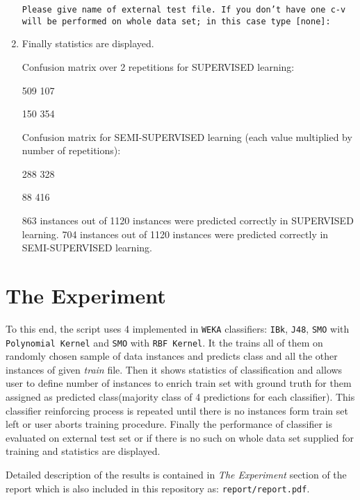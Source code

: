 \begin{enumerate}
\texttt{Please give name of external test file. If you don't have one c-v will be performed on whole data set; in this case  type [none]:}

\item Finally statistics are displayed.

\begin{spverbatim}
Confusion matrix over 2 repetitions for SUPERVISED learning:

    509 107

    150 354

Confusion matrix for SEMI-SUPERVISED learning (each value multiplied  by number of repetitions):

    288 328

    88  416

863 instances out of 1120 instances were predicted correctly in SUPERVISED learning.
704 instances out of 1120 instances were predicted correctly in SEMI-SUPERVISED learning.
\end{spverbatim}

\end{enumerate}

\section*{The Experiment}

To this end, the script uses 4 implemented in \texttt{WEKA} classifiers: \texttt{IBk}, \texttt{J48}, \texttt{SMO} with \texttt{Polynomial Kernel} and \texttt{SMO} with \texttt{RBF Kernel}. It the trains all of them on randomly chosen sample of data instances and predicts class and all the other instances of given \emph{train} file. Then it shows statistics of classification and allows user to define number of instances to enrich train set with ground truth for them assigned as predicted class(majority class of 4 predictions for each classifier). This classifier reinforcing process is repeated until there is no instances form train set left or user aborts training procedure. Finally the performance of classifier is evaluated on external test set or if there is no such on whole data set supplied for training and statistics are displayed.

Detailed description of the results is contained in \emph{The Experiment} section of the report which is also included in this repository as: \texttt{report\slash report.pdf}.
